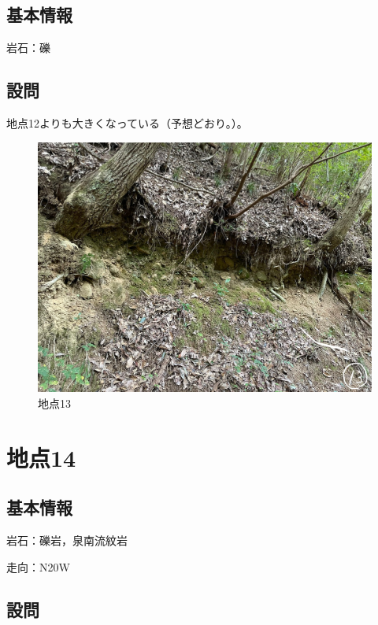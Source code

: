 \documentclass[uplatex,b5paper]{jsreport}
\begin{document}
    \subsection{基本情報}
    岩石：礫
    \subsection{設問}
    地点12よりも大きくなっている（予想どおり。）。
  \begin{figure}[h]
    \begin{center}
      \includegraphics[scale=0.25]{files/地学実習/地点13.jpg}
      \caption{地点13}
    \end{center}    
  \end{figure}
  \clearpage

  \section{地点14}
    \subsection{基本情報}
    岩石：礫岩，泉南流紋岩\par
    走向：N20\textdegree W
    \subsection{設問}
\end{document}
